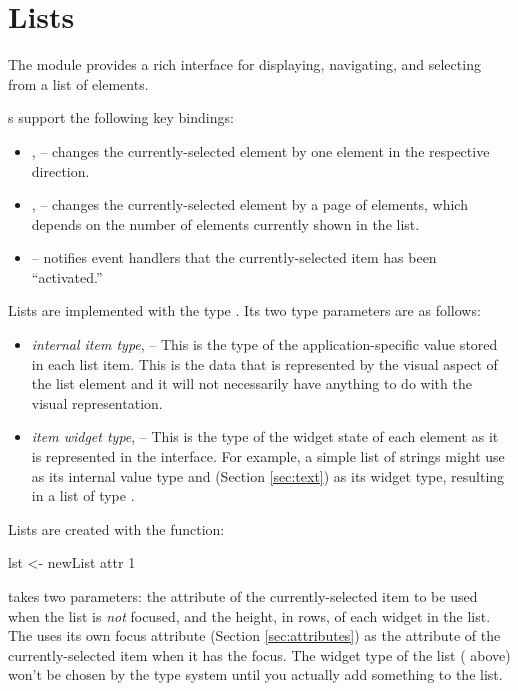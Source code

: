 \section{Lists}
\label{sec:lists}

The  module provides a rich interface for displaying,
navigating, and selecting from a list of elements.

s support the following key bindings:

\begin{itemize}
\item {},  -- changes the currently-selected element by
  one element in the respective direction.
\item {},  -- changes the currently-selected
  element by a page of elements, which depends on the number of
  elements currently shown in the list.
\item {} -- notifies event handlers that the
  currently-selected item has been ``activated.''
\end{itemize}

Lists are implemented with the type .  Its two type
parameters are as follows:

\begin{itemize}
\item \textit{internal item type},  -- This is the type of the
  application-specific value stored in each list item.  This is the
  data that is represented by the visual aspect of the list element
  and it will not necessarily have anything to do with the visual
  representation.
\item \textit{item widget type},  -- This is the type of the
  widget state of each element as it is represented in the interface.
  For example, a simple list of strings might use  as its
  internal value type and  (Section
  \ref{sec:text}) as its widget type, resulting in a list of type
  .
\end{itemize}

Lists are created with the  function:

\begin{haskellcode}
 lst <- newList attr 1
\end{haskellcode}

 takes two parameters: the attribute of the currently-selected item
to be used when the list is \textit{not} focused, and the height, in rows, of
each widget in the list.  The  uses its own focus attribute (Section
\ref{sec:attributes}) as the attribute of the currently-selected item when it
has the focus.  The widget type of the list ( above) won't be chosen by
the type system until you actually add something to the list.


